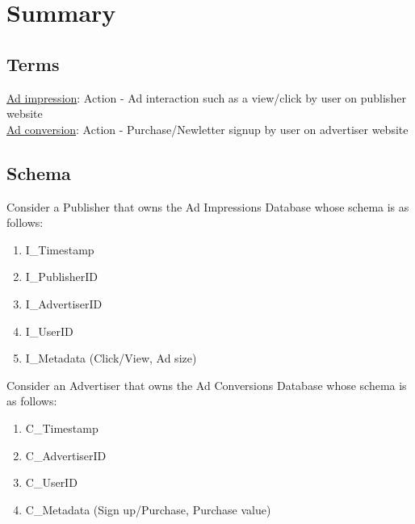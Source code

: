 
\clearpage
{}

%
\setcounter{section}{0} %

\section{Summary}
\subsection{Terms}
\underline{Ad impression}: Action - Ad interaction such as a view/click by user on publisher website \\

\underline{Ad conversion}: Action - Purchase/Newletter signup by user on advertiser website \\

\subsection{Schema}
Consider a Publisher that owns the Ad Impressions Database whose schema is as follows:
\begin{enumerate}
    \item I\_Timestamp
    \item I\_PublisherID
    \item I\_AdvertiserID
    \item I\_UserID
    \item I\_Metadata (Click/View, Ad size)
\end{enumerate}

Consider an Advertiser that owns the Ad Conversions Database whose schema is as follows:
\begin{enumerate}
    \item C\_Timestamp
    \item C\_AdvertiserID
    \item C\_UserID
    \item C\_Metadata (Sign up/Purchase, Purchase value)
\end{enumerate}

